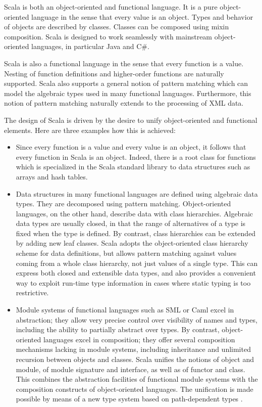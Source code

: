 Scala is both an object-oriented and functional language.  It is a
pure object-oriented language in the sense that every value is an
object. Types and behavior of objects are described by
classes. Classes can be composed using mixin composition.  Scala is
designed to work seamlessly with mainstream object-oriented languages,
in particular Java and C\#.

Scala is also a functional language in the sense that every function
is a value. Nesting of function definitions and higher-order functions
are naturally supported. Scala also supports a general notion of
pattern matching which can model the algebraic types used in many
functional languages. Furthermore, this notion of pattern matching
naturally extends to the processing of XML data.

The design of Scala is driven by the desire to unify object-oriented
and functional elements. Here are three examples how this is achieved:
\begin{itemize}
\item
Since every function is a value and every value is an object, it
follows that every function in Scala is an object. Indeed, there is a
root class for functions which is specialized in the Scala standard
library to data structures such as arrays and hash tables.
\item
Data structures in many functional languages are defined using
algebraic data types. They are decomposed using pattern matching.
Object-oriented languages, on the other hand, describe data with class
hierarchies. Algebraic data types are usually closed, in that the
range of alternatives of a type is fixed when the type is defined.  By
contrast, class hierarchies can be extended by adding new leaf
classes.  Scala adopts the object-oriented class hierarchy scheme for
data definitions, but allows pattern matching against values coming
from a whole class hierarchy, not just values of a single type.
This can express both closed and extensible data types, and also
provides a convenient way to exploit run-time type information in
cases where static typing is too restrictive.
\item
Module systems of functional languages such as SML or Caml excel in
abstraction; they allow very precise control over visibility of names
and types, including the ability to partially abstract over types.  By
contrast, object-oriented languages excel in composition; they offer
several composition mechanisms lacking in module systems, including
inheritance and unlimited recursion between objects and classes.
Scala unifies the notions of object and module, of module signature
and interface, as well as of functor and class. This combines the
abstraction facilities of functional module systems with the
composition constructs of object-oriented languages. The unification
is made possible by means of a new type system based on path-dependent
types \cite{odersky-et-al:fool10}.
\end{itemize}
